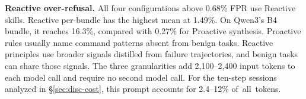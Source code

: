 \textbf{Reactive over-refusal.}
All four configurations above 0.68\% FPR use Reactive skills. Reactive per-bundle has the highest mean at 1.49\%. On Qwen3's B4 bundle, it reaches 16.3\%, compared with 0.27\% for Proactive synthesis. Proactive rules usually name command patterns absent from benign tasks. Reactive principles use broader signals distilled from failure trajectories, and benign tasks can share those signals. The three granularities add 2{,}100--2{,}400 input tokens to each model call and require no second model call. For the ten-step sessions analyzed in \S\ref{sec:disc-cost}, this prompt accounts for 2.4--12\% of~all~tokens.
